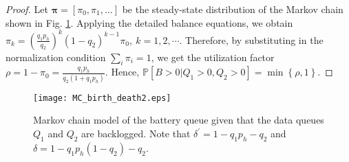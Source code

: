 \documentclass[draftcls,12pt,onecolumn]{IEEEtran}
\begin{document}
\begin{proof}
Let $\boldsymbol{\pi}=[\pi_0,\pi_1,...]$ be the steady-state distribution of the Markov chain shown in Fig. \ref{fig:MC_half_duplex}. Applying the detailed balance equations, we obtain 
$ \pi_k = \left( \frac{q_1 p_{h}}{q_2}\right)^k (1-q_2)^{k-1} \pi_0, \ k=1,2,\cdots. $
Therefore, by substituting in the normalization condition $\sum_i \pi_i =1$, we get the utilization factor 
$ \rho= 1-\pi_0 = \frac{q_1 p_{h}}{q_2(1+q_1 p_{h})}.  $
Hence,  $ \mathbb{P}[B>0| Q_1>0, Q_2>0]= \min \left\lbrace \rho, 1\right\rbrace. $
\end{proof}


\begin{figure}
\texttt{[image: MC\_birth\_death2.eps]}
\centering
\caption{Markov chain model of the battery queue given that the data queues $Q_1$ and $Q_2$ are backlogged. Note that 
$\delta^{\prime}\! = \! 1\!- \!q_1 p_h \! - q_2$ and $ \delta \! = \! 1\!- \!q_1 p_h (1-q_2) \! - q_2$.}\label{fig:MC_half_duplex}
\end{figure}
\vspace{-0.2in}
\end{document}
